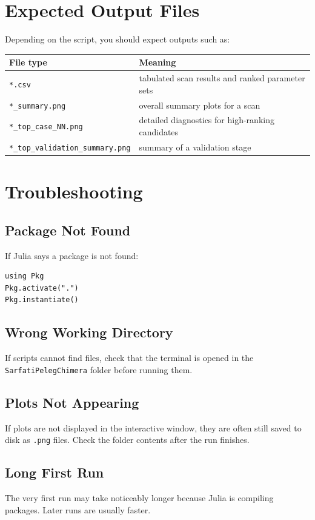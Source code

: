 \documentclass[11pt,a4paper]{article}
\begin{document}
\section{Expected Output Files}
Depending on the script, you should expect outputs such as:
\begin{longtable}{>{\ttfamily}p{} p{}}
\toprule
File type & Meaning \\
\midrule
\textnormal{\texttt{*.csv}} & tabulated scan results and ranked parameter sets \\
\textnormal{\texttt{*_summary.png}} & overall summary plots for a scan \\
\textnormal{\texttt{*_top\_case\_NN.png}} & detailed diagnostics for high-ranking candidates \\
\textnormal{\texttt{*_top\_validation\_summary.png}} & summary of a validation stage \\
\bottomrule
\end{longtable}

\section{Troubleshooting}
\subsection{Package Not Found}
If Julia says a package is not found:
\begin{lstlisting}[style=wincli]
using Pkg
Pkg.activate(".")
Pkg.instantiate()
\end{lstlisting}

\subsection{Wrong Working Directory}
If scripts cannot find files, check that the terminal is opened in the
\texttt{SarfatiPelegChimera} folder before running them.

\subsection{Plots Not Appearing}
If plots are not displayed in the interactive window, they are often still saved
to disk as \texttt{.png} files. Check the folder contents after the run finishes.

\subsection{Long First Run}
The very first run may take noticeably longer because Julia is compiling packages.
Later runs are usually faster.
\end{document}
